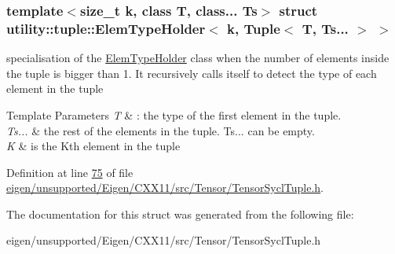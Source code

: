\subsubsection*{template$<$size\+\_\+t k, class T, class... Ts$>$\newline
struct utility\+::tuple\+::\+Elem\+Type\+Holder$<$ k, Tuple$<$ T, Ts... $>$ $>$}

specialisation of the \hyperlink{structutility_1_1tuple_1_1_elem_type_holder}{Elem\+Type\+Holder} class when the number of elements inside the tuple is bigger than 1. It recursively calls itself to detect the type of each element in the tuple 


\begin{DoxyTemplParams}{Template Parameters}
{\em T} & \+: the type of the first element in the tuple. \\
\hline
{\em Ts...} & the rest of the elements in the tuple. Ts... can be empty. \\
\hline
{\em K} & is the Kth element in the tuple \\
\hline
\end{DoxyTemplParams}


Definition at line \hyperlink{eigen_2unsupported_2_eigen_2_c_x_x11_2src_2_tensor_2_tensor_sycl_tuple_8h_source_l00075}{75} of file \hyperlink{eigen_2unsupported_2_eigen_2_c_x_x11_2src_2_tensor_2_tensor_sycl_tuple_8h_source}{eigen/unsupported/\+Eigen/\+C\+X\+X11/src/\+Tensor/\+Tensor\+Sycl\+Tuple.\+h}.



The documentation for this struct was generated from the following file\+:\begin{DoxyCompactItemize}
\item 
eigen/unsupported/\+Eigen/\+C\+X\+X11/src/\+Tensor/\+Tensor\+Sycl\+Tuple.\+h\end{DoxyCompactItemize}

